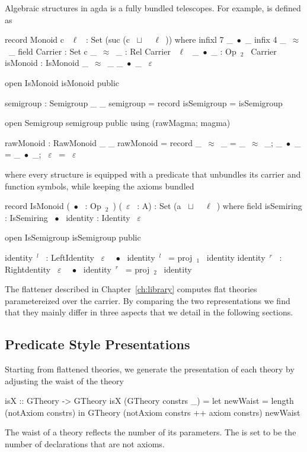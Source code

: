 Algebraic structures in agda is a fully bundled telescopes. For example,  is defined as
\begin{agdacode}
record Monoid c ~$\ell$~ : Set (suc (c ~$\sqcup$~ ~$\ell$~)) where 
  infixl 7 _~$\bullet$~_
  infix 4 _~$\approx$~_
  field 
   Carrier : Set c 
   _~$\approx$~_ : Rel Carrier ~$\ell$~ 
   _~$\bullet$~_ : Op~$_2$~ Carrier 
   isMonoid : IsMonoid _~$\approx$~_ _~$\bullet$~_ ~$\varepsilon$~ 
   
   open IsMonoid isMonoid public
   
   semigroup : Semigroup _ _
   semigroup = record { isSemigroup = isSemigroup }
   
   open Semigroup semigroup public using (rawMagma; magma)
   
   rawMonoid : RawMonoid _ _
   rawMonoid = record { _~$\approx$~_ = _~$\approx$~_; _~$\bullet$~_ = _~$\bullet$~_; ~$\varepsilon$~ = ~$\varepsilon$~}
\end{agdacode}
where every structure is equipped with a predicate that unbundles its carrier and function symbols, while keeping the axioms bundled 
\begin{agdacode}
record IsMonoid (~$\bullet$~ : Op~$_2$~) (~$\varepsilon$~ : A) : Set (a ~$\sqcup$~ ~$\ell$~) where 
  field 
   isSemiring : IsSemiring ~$\bullet$~ 
   identity : Identity ~$\varepsilon$~
     
  open IsSemigroup isSemigroup public
     
  identity~$^l$~ : LeftIdentity ~$\varepsilon$~ ~$\bullet$~ 
  identity~$^l$~ = proj~$_1$~ identity  
  identity~$^r$~ : Rightdentity ~$\varepsilon$~ ~$\bullet$~ 
  identity~$^r$~ = proj~$_2$~ identity           
\end{agdacode}
The flattener described in Chapter~\ref{ch:library} computes flat theories parametereized over the carrier. By comparing the two representations we find that they mainly differ in three aspects that we detail in the following sections. 
\subsection{Predicate Style Presentations}
Starting from flattened theories, we generate the  presentation of each theory by adjusting the waist of the theory
\begin{hscode}
isX :: GTheory -> GTheory
isX (GTheory constrs _) =
  let newWaist = length (notAxiom constrs) 
  in GTheory (notAxiom constrs ++ axiom constrs) newWaist
\end{hscode}
The waist of a theory reflects the number of its parameters. The  is set to be the number of declarations that are not axioms. 

